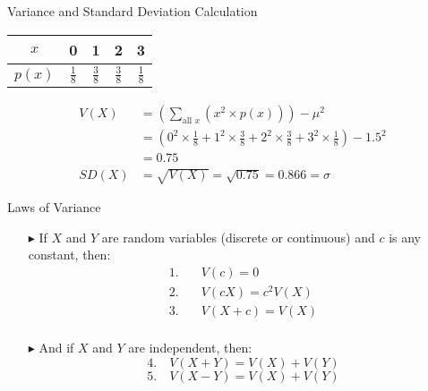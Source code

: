 \documentclass[12pt]{beamer}
\begin{document}
\begin{frame}{Variance and Standard Deviation Calculation}
	\begin{center}
		\begin{tabular}{ccccc}
			\toprule
			$x$&0&1&2&3\\
			\toprule
			$p(x)$&$\frac{1}{8}$&$\frac{3}{8}$&$\frac{3}{8}$&$\frac{1}{8}$\\
			\bottomrule
		\end{tabular}
	\end{center}
	

\begin{align*}
	V(X) &= \left(\sum_{\text{all }x} (x^2 \times p(x))\right) - \mu^2 \\[1ex]
	&= \left(0^2 \times \frac{1}{8} + 1^2 \times \frac{3}{8} + 2^2 \times \frac{3}{8} + 3^2 \times \frac{1}{8}\right) - 1.5^2 \\[1ex]
	&= 0.75 \\[2ex]
	SD(X) &= \sqrt{V(X)} = \sqrt{0.75} = 0.866 = \sigma
\end{align*}
\end{frame}
\begin{frame}{Laws of Variance}
	\begin{itemize}
		\item[\color{blue}$\blacktriangleright$] If $X$ and $Y$ are random variables (discrete or continuous) and $c$ is any constant, then:
		\begin{align*}
			1. & \quad V(c)=0 \\
			2. & \quad V(cX)=c^2V(X)\\
			3. & \quad V(X+c)=V(X)\\
		\end{align*}
		\item[\color{blue}$\blacktriangleright$] And if $X$ and $Y$ are independent, then:
		$$4. \quad V(X+Y)=V(X)+V(Y)$$
		$$5. \quad V(X-Y)=V(X)+V(Y)$$
	\end{itemize}
\end{frame}
\end{document}
